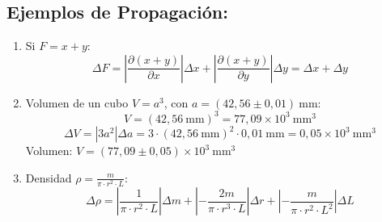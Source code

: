 \documentclass[12pt,a4paper]{article}
\begin{document}
\subsection*{Ejemplos de Propagación:}
\begin{enumerate}
    \item Si $F = x + y$:
    \[ \Delta F = \left| \frac{\partial (x + y)}{\partial x} \right| \Delta x + \left| \frac{\partial (x + y)}{\partial y} \right| \Delta y = \Delta x + \Delta y \]
    \item Volumen de un cubo $V = a^3$, con $a = (42,56 \pm 0,01)\ \text{mm}$:
    \[ V = (42,56\ \text{mm})^3 = 77,09 \times 10^3\ \text{mm}^3 \]
    \[ \Delta V = \left| 3a^2 \right| \Delta a = 3 \cdot (42,56\ \text{mm})^2 \cdot 0,01\ \text{mm} = 0,05 \times 10^3\ \text{mm}^3 \]
    Volumen: $V = (77,09 \pm 0,05) \times 10^3\ \text{mm}^3$
    \item Densidad $\rho = \frac{m}{\pi \cdot r^2 \cdot L}$:
    \[ \Delta \rho = \left| \frac{1}{\pi \cdot r^2 \cdot L} \right| \Delta m + \left| - \frac{2m}{\pi \cdot r^3 \cdot L} \right| \Delta r + \left| - \frac{m}{\pi \cdot r^2 \cdot L^2} \right| \Delta L \]
\end{enumerate}
\end{document}
